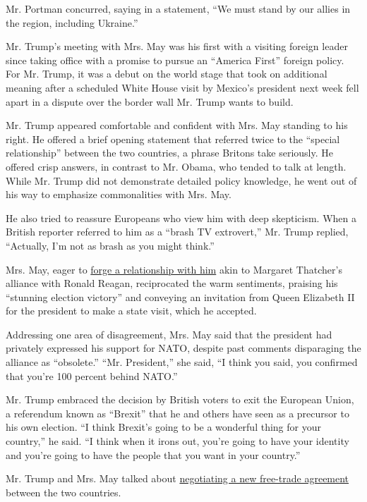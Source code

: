 Mr. Portman concurred, saying in a statement, ``We must stand by our
allies in the region, including Ukraine.''

Mr. Trump's meeting with Mrs. May was his first with a visiting foreign
leader since taking office with a promise to pursue an ``America First''
foreign policy. For Mr. Trump, it was a debut on the world stage that
took on additional meaning after a scheduled White House visit by
Mexico's president next week fell apart in a dispute over the border
wall Mr. Trump wants to build.

Mr. Trump appeared comfortable and confident with Mrs. May standing to
his right. He offered a brief opening statement that referred twice to
the ``special relationship'' between the two countries, a phrase Britons
take seriously. He offered crisp answers, in contrast to Mr. Obama, who
tended to talk at length. While Mr. Trump did not demonstrate detailed
policy knowledge, he went out of his way to emphasize commonalities with
Mrs. May.

He also tried to reassure Europeans who view him with deep skepticism.
When a British reporter referred to him as a ``brash TV extrovert,'' Mr.
Trump replied, ``Actually, I'm not as brash as you might think.''

Mrs. May, eager to
\href{https://www.nytimes.com/2017/01/27/world/europe/theresa-may-trump.html}{forge
a relationship with him} akin to Margaret Thatcher's alliance with
Ronald Reagan, reciprocated the warm sentiments, praising his ``stunning
election victory'' and conveying an invitation from Queen Elizabeth II
for the president to make a state visit, which he accepted.

Addressing one area of disagreement, Mrs. May said that the president
had privately expressed his support for NATO, despite past comments
disparaging the alliance as ``obsolete.'' ``Mr. President,'' she said,
``I think you said, you confirmed that you're 100 percent behind NATO.''

Mr. Trump embraced the decision by British voters to exit the European
Union, a referendum known as ``Brexit'' that he and others have seen as
a precursor to his own election. ``I think Brexit's going to be a
wonderful thing for your country,'' he said. ``I think when it irons
out, you're going to have your identity and you're going to have the
people that you want in your country.''

Mr. Trump and Mrs. May talked about
\href{https://www.nytimes.com/2017/01/26/business/trump-trade-theresa-may-uk-britain.html}{negotiating
a new free-trade agreement} between the two countries.

